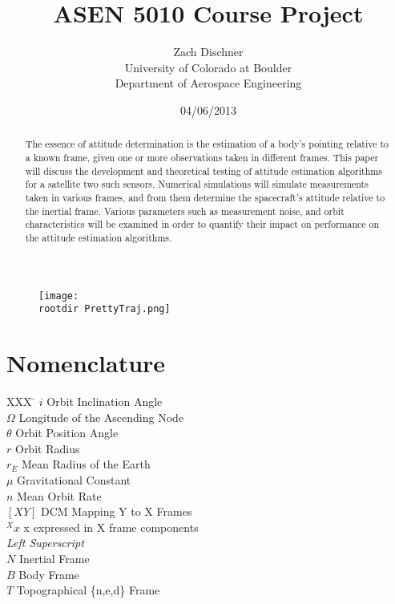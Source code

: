 \documentclass[]{aiaa-tc}%
\title{ASEN 5010 Course Project}
\author{Zach Dischner \\ University of Colorado at Boulder \\ Department of Aerospace Engineering}
\date{04/06/2013}
\newcommand{\rootdir}{./Figures/}
\begin{document}
\maketitle

\begin{abstract}
The essence of attitude determination is the estimation of a body's pointing relative to a known frame, given one or more observations taken in different frames. This paper will discuss the development and theoretical testing of attitude estimation algorithms for a satellite two such sensors. Numerical simulations will simulate measurements taken in various frames, and from them determine the spacecraft's attitude relative to the inertial frame. Various parameters such as measurement noise, and orbit characteristics will be examined in order to quantify their impact on performance on the attitude estimation algorithms. 

\end{abstract}

\begin{centering}
	\begin{figure}[Hh]
	\hspace{2.5cm}
		\texttt{[image: \\rootdir PrettyTraj.png]} 
	\end{figure}
\end{centering}

\vspace{2cm}

\section*{Nomenclature}

\begin{tabbing}
  XXX \= \kill%
  $i$ \> 		Orbit Inclination Angle 			\\
  $\Omega$ \> 	Longitude of the Ascending Node 	\\
  $\theta$ \> 	Orbit Position Angle 				\\
  $r$ \> 		Orbit Radius 					\\
  $r_E$ \> 		Mean Radius of the Earth			\\
  $\mu$ \> 	Gravitational Constant 			\\
  $n$ \> 		Mean Orbit Rate				\\
  $[XY]$ \> 	DCM Mapping Y to X Frames 		\\
  $^Xx$ \>  	x expressed in X frame components \\

\textit{Left Superscript}\\
  $N$ \> 		Inertial Frame 					\\
  $B$ \> 		Body Frame 					\\
  $T$ \> 		Topographical \{n,e,d\} Frame 		\\
 \end{tabbing}
\end{document}
